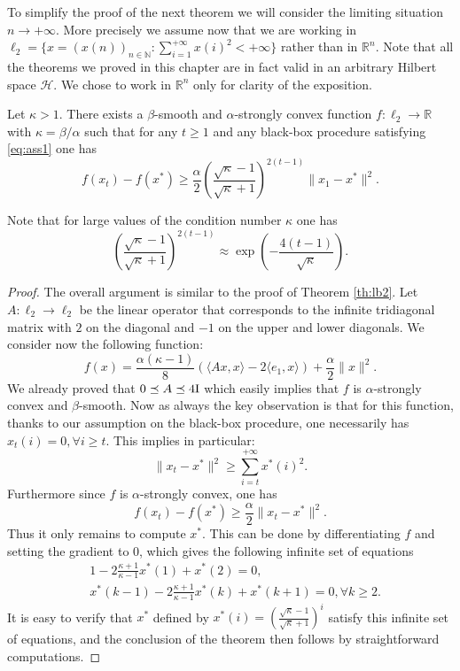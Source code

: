To simplify the proof of the next theorem we will consider the limiting situation $n \to +\infty$. More precisely we assume now that we are working in $\ell_2 = \{ x = (x(n))_{n \in \mathbb{N}} : \sum_{i=1}^{+\infty} x(i)^2 < + \infty\}$ rather than in $\mathbb{R}^n$. Note that all the theorems we proved in this chapter are in fact valid in an arbitrary Hilbert space $\mathcal{H}$. We chose to work in $\mathbb{R}^n$ only for clarity of the exposition.

\begin{theorem} \label{th:lb3}
Let $\kappa > 1$. There exists a $\beta$-smooth and $\alpha$-strongly convex function $f: \ell_2 \rightarrow \mathbb{R}$ with $\kappa = \beta / \alpha$ such that for any $t \geq 1$ and any black-box procedure satisfying \eqref{eq:ass1} one has
$$f(x_t) - f(x^*) \geq  \frac{\alpha}{2}  \left(\frac{\sqrt{\kappa} - 1}{\sqrt{\kappa}+1}\right)^{2 (t-1)} \|x_1 - x^*\|^2 .$$
\end{theorem}

Note that for large values of the condition number $\kappa$ one has 
$$\left(\frac{\sqrt{\kappa} - 1}{\sqrt{\kappa}+1}\right)^{2 (t-1)} \approx \exp\left(- \frac{4 (t-1)}{\sqrt{\kappa}} \right) .$$

\begin{proof}
The overall argument is similar to the proof of Theorem \ref{th:lb2}. Let $A : \ell_2 \rightarrow \ell_2$ be the linear operator that corresponds to the infinite tridiagonal matrix with $2$ on the diagonal and $-1$ on the upper and lower diagonals. We consider now the following function:
$$f(x) = \frac{\alpha (\kappa-1)}{8} \left(\langle Ax, x\rangle - 2 \langle e_1, x \rangle \right) + \frac{\alpha}{2} \|x\|^2 .$$
We already proved that $0 \preceq A \preceq 4 \mathrm{I}$ which easily implies that $f$ is $\alpha$-strongly convex and $\beta$-smooth. Now as always the key observation is that for this function, thanks to our assumption on the black-box procedure, one necessarily has $x_t(i) = 0, \forall i \geq t$. This implies in particular:
$$\|x_t - x^*\|^2 \geq \sum_{i=t}^{+\infty} x^*(i)^2 .$$
Furthermore since $f$ is $\alpha$-strongly convex, one has
$$f(x_t) - f(x^*) \geq \frac{\alpha}{2} \|x_t - x^*\|^2 .$$
Thus it only remains to compute $x^*$. This can be done by differentiating $f$ and setting the gradient to $0$, which gives the following infinite set of equations
\begin{align*}
& 1 - 2 \frac{\kappa+1}{\kappa-1} x^*(1) + x^*(2) = 0 , \\
& x^*(k-1) - 2 \frac{\kappa+1}{\kappa-1} x^*(k) + x^*(k+1) = 0, \forall k \geq 2 .
\end{align*}
It is easy to verify that $x^*$ defined by $x^*(i) = \left(\frac{\sqrt{\kappa} - 1}{\sqrt{\kappa} + 1}\right)^i$ satisfy this infinite set of equations, and the conclusion of the theorem then follows by straightforward computations.
\end{proof}


